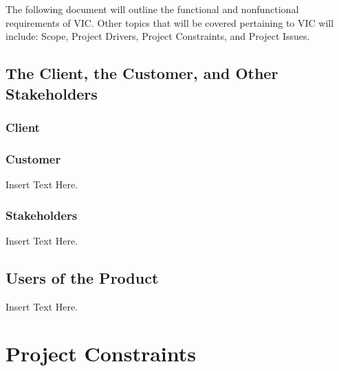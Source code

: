 \documentclass [12pt]{article}
\begin{document}
The following document will outline the functional and nonfunctional requirements of VIC.  Other topics that will be covered pertaining to VIC will include: Scope, Project Drivers, Project Constraints, and Project Issues.

\subsection{\large The Client, the Customer, and Other Stakeholders}

\subsubsection{Client}
\lipsum[1]  %

\subsubsection{Customer}
 Insert Text Here.

\subsubsection{Stakeholders}
 Insert Text Here.

\subsection{\large Users of the Product} 
Insert Text Here.\\


\section{\textbf{Project Constraints}}


\end{document}
